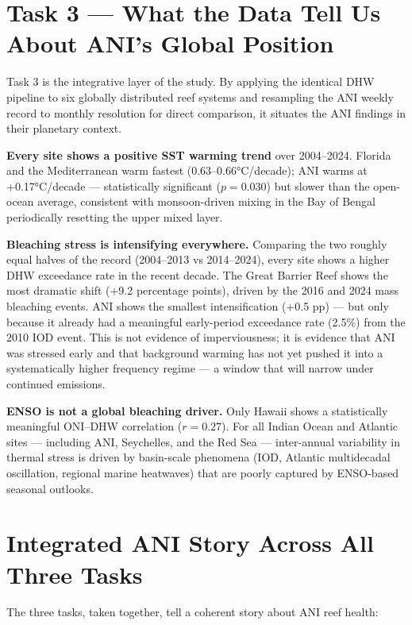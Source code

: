 \documentclass[12pt,a4paper]{report}
\begin{document}
\section{Task 3 — What the Data Tell Us About ANI's Global Position}

Task 3 is the integrative layer of the study. By applying the identical DHW pipeline
to six globally distributed reef systems and resampling the ANI weekly record to
monthly resolution for direct comparison, it situates the ANI findings in their
planetary context.

\textbf{Every site shows a positive SST warming trend} over 2004--2024.
Florida and the Mediterranean warm fastest (0.63--0.66°C/decade); ANI warms at
+0.17°C/decade — statistically significant ($p = 0.030$) but slower than the
open-ocean average, consistent with monsoon-driven mixing in the Bay of Bengal
periodically resetting the upper mixed layer.

\textbf{Bleaching stress is intensifying everywhere.}
Comparing the two roughly equal halves of the record (2004--2013 vs 2014--2024),
every site shows a higher DHW exceedance rate in the recent decade.
The Great Barrier Reef shows the most dramatic shift (+9.2 percentage points),
driven by the 2016 and 2024 mass bleaching events. ANI shows the smallest
intensification (+0.5 pp) — but only because it already had a meaningful early-period
exceedance rate (2.5\%) from the 2010 IOD event. This is not evidence of imperviousness;
it is evidence that ANI was stressed early and that background warming has not yet
pushed it into a systematically higher frequency regime — a window that will narrow
under continued emissions.

\textbf{ENSO is not a global bleaching driver.}
Only Hawaii shows a statistically meaningful ONI--DHW correlation ($r = 0.27$).
For all Indian Ocean and Atlantic sites — including ANI, Seychelles, and the
Red Sea — inter-annual variability in thermal stress is driven by basin-scale
phenomena (IOD, Atlantic multidecadal oscillation, regional marine heatwaves)
that are poorly captured by ENSO-based seasonal outlooks.

\section{Integrated ANI Story Across All Three Tasks}

The three tasks, taken together, tell a coherent story about ANI reef health:
\end{document}
